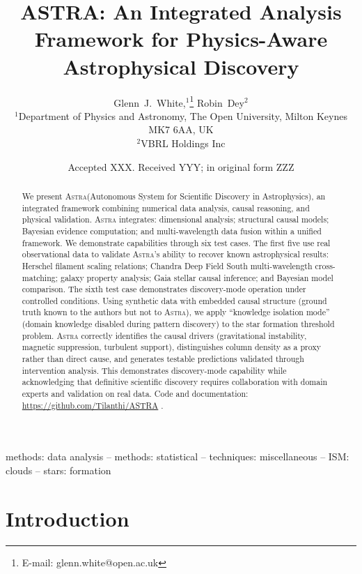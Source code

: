 \documentclass[fleqn,usenatbib]{mnras}
\title[ASTRA: Integrated Analysis Framework]{ASTRA: An Integrated Analysis Framework for Physics-Aware Astrophysical Discovery}
\author[White \& Dey]{%
Glenn~J.~White,$^{1}$\thanks{E-mail: glenn.white@open.ac.uk}
Robin~Dey$^{2}$
\\
$^{1}$Department of Physics and Astronomy, The Open University, Milton Keynes MK7 6AA, UK\\
$^{2}$VBRL Holdings Inc}
\date{Accepted XXX. Received YYY; in original form ZZZ}
\newcommand{\astra}{\textsc{Astra}\xspace}
\begin{document}
\maketitle

\begin{abstract}
We present \astra (Autonomous System for Scientific Discovery in Astrophysics), an integrated framework combining numerical data analysis, causal reasoning, and physical validation.
\astra integrates: dimensional analysis; structural causal models; Bayesian evidence computation; and multi-wavelength data fusion within a unified framework.
We demonstrate capabilities through six test cases.
The first five use real observational data to validate \astra's ability to recover known astrophysical results: Herschel filament scaling relations; Chandra Deep Field South multi-wavelength cross-matching; galaxy property analysis; Gaia stellar causal inference; and Bayesian model comparison.
The sixth test case demonstrates discovery-mode operation under controlled conditions.
Using synthetic data with embedded causal structure (ground truth known to the authors but not to \astra), we apply ``knowledge isolation mode'' (domain knowledge disabled during pattern discovery) to the star formation threshold problem.
\astra correctly identifies the causal drivers (gravitational instability, magnetic suppression, turbulent support), distinguishes column density as a proxy rather than direct cause, and generates testable predictions validated through intervention analysis.
This demonstrates discovery-mode capability while acknowledging that definitive scientific discovery requires collaboration with domain experts and validation on real data.
Code and documentation: \url{https://github.com/Tilanthi/ASTRA} \citep{WhiteDey2026}.
\end{abstract}

\begin{keywords}
methods: data analysis -- methods: statistical -- techniques: miscellaneous -- ISM: clouds -- stars: formation
\end{keywords}

\section{Introduction}
\label{sec:introduction}
\end{document}
